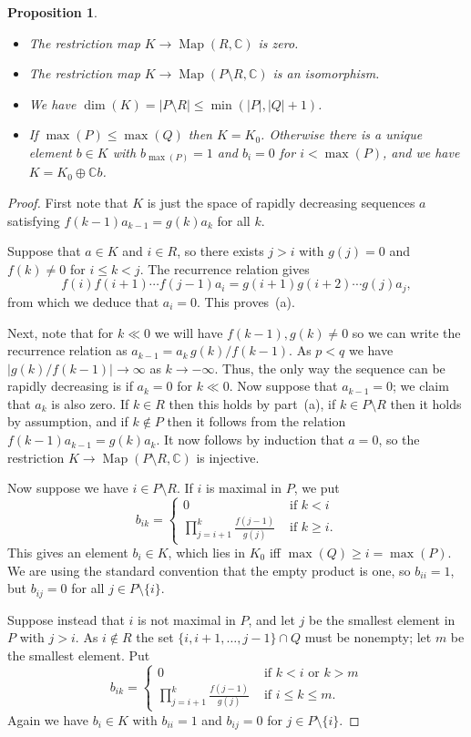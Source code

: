 \documentclass{amsart}
\newcommand{\Map}       {\operatorname{Map}}
\newcommand{\C}         {{\mathbb{C}}}
\newcommand{\sm}        {\setminus}
\renewcommand{\:}{\colon}
\newtheorem{proposition}[theorem]{Proposition}
\theoremstyle{definition}
\begin{document}
\begin{proposition}\label{prop-ann-S}\leavevmode
 \begin{itemize}
  \item[(a)] The restriction map $K\to\Map(R,\C)$ is zero.
  \item[(b)] The restriction map $K\to\Map(P\sm R,\C)$ is an
   isomorphism.
  \item[(c)] We have $\dim(K)=|P\sm R|\leq\min(|P|,|Q|+1)$.
  \item[(d)] If $\max(P)\leq\max(Q)$ then $K=K_0$.  Otherwise there is a
   unique element $b\in K$ with $b_{\max(P)}=1$ and $b_i=0$ for
   $i<\max(P)$, and we have $K=K_0\oplus\C b$.
 \end{itemize}
\end{proposition}
\begin{proof}
 First note that $K$ is just the space of rapidly decreasing sequences
 $a$ satisfying $f(k-1)a_{k-1}=g(k)a_k$ for all $k$.   

 Suppose that $a\in K$ and $i\in R$, so there exists $j>i$ with
 $g(j)=0$ and $f(k)\neq 0$ for $i\leq k<j$.  The recurrence relation
 gives 
 \[ f(i)f(i+1)\dotsb f(j-1)a_i = g(i+1)g(i+2)\dotsb g(j)a_j, \]
 from which we deduce that $a_i=0$.  This proves~(a).

 Next, note that for $k\ll 0$ we will have $f(k-1),g(k)\neq 0$ so we
 can write the recurrence relation as $a_{k-1}=a_k\,g(k)/f(k-1)$.  As
 $p<q$ we have $|g(k)/f(k-1)|\to\infty$ as $k\to -\infty$.  Thus, the
 only way the sequence can be rapidly decreasing is if $a_k=0$ for
 $k\ll 0$.  Now suppose that $a_{k-1}=0$; we claim that $a_k$ is also
 zero.  If $k\in R$ then this holds by part~(a), if $k\in P\sm R$ then
 it holds by assumption, and if $k\not\in P$ then it follows from the
 relation $f(k-1)a_{k-1}=g(k)a_k$.  It now follows by induction that
 $a=0$, so the restriction $K\to\Map(P\sm R,\C)$ is injective.  

 Now suppose we have $i\in P\sm R$.  If $i$ is maximal in $P$, we put 
 \[ b_{ik} = \begin{cases}
     0 & \text{ if } k < i \\
     \prod_{j=i+1}^k \frac{f(j-1)}{g(j)} & \text{ if } k \geq i.
    \end{cases}
 \]
 This gives an element $b_i\in K$, which lies in $K_0$ iff
 $\max(Q)\geq i=\max(P)$.  We are using the standard convention that
 the empty product is one, so $b_{ii}=1$, but $b_{ij}=0$ for all
 $j\in P\sm\{i\}$.

 Suppose instead that $i$ is not maximal in
 $P$, and let $j$ be the smallest element in $P$ with $j>i$.  As
 $i\not\in R$ the set $\{i,i+1,\dotsc,j-1\}\cap Q$ must be nonempty;
 let $m$ be the smallest element.  Put 
 \[ b_{ik} = \begin{cases}
     0 & \text{ if } k < i \text{ or } k > m \\
     \prod_{j=i+1}^k \frac{f(j-1)}{g(j)} & \text{ if } i\leq k\leq m.
    \end{cases}
 \]
 Again we have $b_i\in K$ with $b_{ii}=1$ and $b_{ij}=0$ for
 $j\in P\sm\{i\}$.


\end{proof}
\end{document}
